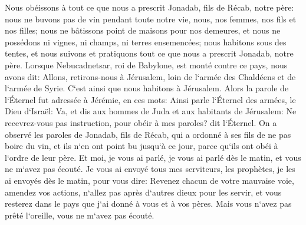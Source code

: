 \verse Nous obéissons à tout ce que nous a prescrit Jonadab, fils de Récab, notre père: nous ne buvons pas de vin pendant toute notre vie, nous, nos femmes, nos fils et nos filles; 
\verse nous ne bâtissons point de maisons pour nos demeures, et nous ne possédons ni vignes, ni champs, ni terres ensemencées; 
\verse nous habitons sous des tentes, et nous suivons et pratiquons tout ce que nous a prescrit Jonadab, notre père. 
\verse Lorsque Nebucadnetsar, roi de Babylone, est monté contre ce pays, nous avons dit: Allons, retirons-nous à Jérusalem, loin de l`armée des Chaldéens et de l`armée de Syrie. C`est ainsi que nous habitons à Jérusalem. 
\verse Alors la parole de l`Éternel fut adressée à Jérémie, en ces mots: 
\verse Ainsi parle l`Éternel des armées, le Dieu d`Israël: Va, et dis aux hommes de Juda et aux habitants de Jérusalem: Ne recevrez-vous pas instruction, pour obéir à mes paroles? dit l`Éternel. 
\verse On a observé les paroles de Jonadab, fils de Récab, qui a ordonné à ses fils de ne pas boire du vin, et ils n`en ont point bu jusqu`à ce jour, parce qu`ils ont obéi à l`ordre de leur père. Et moi, je vous ai parlé, je vous ai parlé dès le matin, et vous ne m`avez pas écouté. 
\verse Je vous ai envoyé tous mes serviteurs, les prophètes, je les ai envoyés dès le matin, pour vous dire: Revenez chacun de votre mauvaise voie, amendez vos actions, n`allez pas après d`autres dieux pour les servir, et vous resterez dans le pays que j`ai donné à vous et à vos pères. Mais vous n`avez pas prêté l`oreille, vous ne m`avez pas écouté. 
